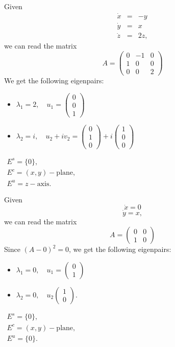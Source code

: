\documentclass{article}
\newcommand{\vectwo}[2]{\begin{pmatrix} #1\\#2\end{pmatrix}}
\newcommand{\vecthree}[3]{\begin{pmatrix} #1\\#2\\#3\end{pmatrix}}
\newcommand*{\mattwo}[4]{\begin{pmatrix}
    #1&#2\\#3&#4
\end{pmatrix}}
\newcommand*{\matthree}[9]{\begin{pmatrix}
    #1&#2&#3\\#4&#5&#6\\#7&#8&#9
\end{pmatrix}}
\begin{document}
\begin{exam}
    Given
    $$\begin{array}{rcl}
    \dot x &=& -y\\
    \dot y &=& x\\
    \dot z &=& 2z,
    \end{array}$$
     we can read the matrix
    $$A=\matthree{0}{-1}{0}{1}{0}{0}{0}{0}{2}$$
    We get the following eigenpairs:
    \begin{itemize}
        \item $\lambda_1=2, \quad u_1=\vecthree001$

        \item $\lambda_2=i, \quad u_2+iv_2=\vecthree010+i\vecthree100$
    \end{itemize}
    $\begin{array}{ll}E^s=\{0\},\\E^c=(x,y)-\text{plane},\\
    E^u=z-\text{axis}.
    \end{array}$
\end{exam}

\begin{exam}
    Given
    $$\dot x=0$$
    $$\dot y = x,$$
    we can read the matrix
    $$A=\mattwo0010$$
    Since $(A-0)^2 = 0$, we get the following eigenpairs:
    \begin{itemize}
        \item $\lambda_1=0, \quad u_1=\vectwo01$

        \item $\lambda_2=0, \quad u_2\vectwo10$.
    \end{itemize}
    $\begin{array}{ll}E^s=\{0\},\\
    E^c=(x,y)-\text{plane},\\
    E^u=\{0\}.
    \end{array}$
\end{exam}
\end{document}
